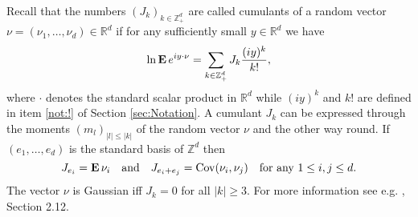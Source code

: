 \documentclass{article}
\numberwithin{equation}{section}
\newcommand{\mR}{\mathbb{R}}
\newcommand{\mZ}{\mathbb{Z}}
\newcommand{\Cov}{\operatorname{Cov}}
\newcommand{\MO}{\mbox{\bf E}\,}
\newcommand{\qmb}{\quad\mbox}
\newcommand{\qu}{\quad}
\newcommand{\sli}{\sum\limits}
\newcommand{\lbl}{\label}
\newcommand{\bee}{\begin{equation}}
\newcommand{\eee}{\end{equation}}
\newcommand{\Zp}{\mathbb{Z}^d_+}
\begin{document}
Recall  that the numbers $(J_k)_{k\in\Zp}$ are called cumulants of a random vector
$\nu=(\nu_1,\ldots,\nu_d) \in\mR^d$ if for any
sufficiently small $y\in\mR^d$ we have
$$
\ln \MO e^{iy\cdot\nu}=\sli_{k\in\Zp} J_k\frac{(iy)^k}{k!},
$$
where $\cdot$ denotes the standard scalar product in $\mR^d$ while
$(iy)^k$ and $k!$ are defined in
item \nolinebreak \ref{not:!} of Section \ref{sec:Notation}.
A cumulant $J_k$ can be expressed
through the moments $(m_l)_{|l|\leq |k|}$ of the random vector $\nu$
and the other way round.
If $(e_1,\ldots,e_d)$ is the standard basis of $\mZ^d$ then
\bee\lbl{cumgeneral}
J_{e_i}=\MO \nu_i \qmb{and}\qu  J_{e_i+e_j}=\Cov(\nu_i,\nu_j) \qmb{for any } 1\leq i,j\leq d.
\eee
The vector $\nu$ is Gaussian iff $J_k=0$ for all $|k|\geq 3$.
For more information see e.g. \cite{Shi}, Section 2.12.
\end{document}
